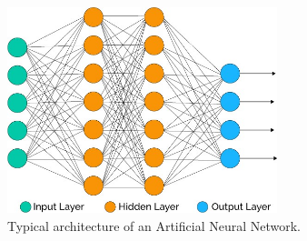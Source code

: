 \begin{figure}[!htb]	\includegraphics[width=0.7\textwidth]{images/architecture_ann.jpg} 
    \centering

\caption{
Typical architecture of an Artificial Neural Network.\cite{ArtificialApplications}
} 

\label{fig:architecture_ann}
\end{figure}